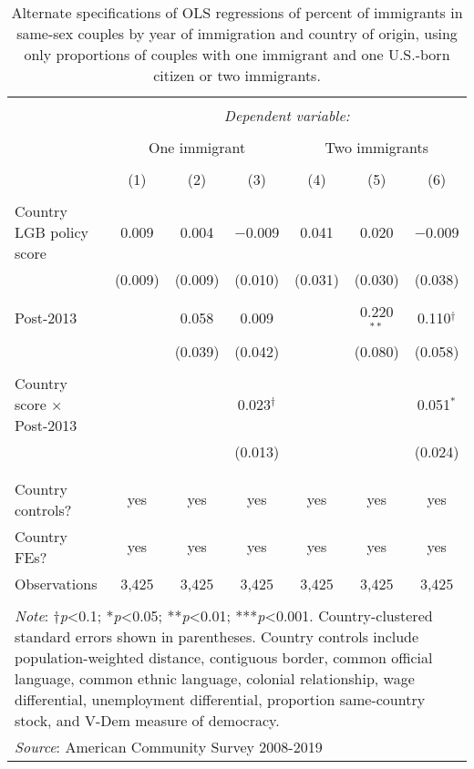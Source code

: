 \documentclass[
  11pt,
]{article}
\begin{document}
\begin{table}[H] \centering 
  \caption{Alternate specifications of OLS regressions of percent of immigrants in same-sex couples by year of immigration and country of origin, using only proportions of couples with one immigrant and one U.S.-born citizen or two immigrants.} 
  \label{tab:country-props-alt2} 
\begin{tabular}{@{\extracolsep{5pt}}lcccccc} 
\\[-1.8ex]\hline 
\hline \\[-1.8ex] 
 & \multicolumn{6}{c}{\textit{Dependent variable:}} \\ 
\cline{2-7} 
\\[-1.8ex] & \multicolumn{3}{c}{One immigrant} & \multicolumn{3}{c}{Two immigrants} \\ 
\\[-1.8ex] & (1) & (2) & (3) & (4) & (5) & (6)\\ 
\hline \\[-1.8ex] 
 Country LGB policy score & 0.009 & 0.004 & $-$0.009 & 0.041 & 0.020 & $-$0.009 \\ 
  & (0.009) & (0.009) & (0.010) & (0.031) & (0.030) & (0.038) \\ 
  & & & & & & \\ 
 Post-2013 &  & 0.058 & 0.009 &  & 0.220$^{**}$ & 0.110$^{†}$ \\ 
  &  & (0.039) & (0.042) &  & (0.080) & (0.058) \\ 
  & & & & & & \\ 
 Country score × Post-2013 &  &  & 0.023$^{†}$ &  &  & 0.051$^{*}$ \\ 
  &  &  & (0.013) &  &  & (0.024) \\ 
  & & & & & & \\ 
\hline \\[-1.8ex] 
Country controls? & yes & yes & yes & yes & yes & yes \\ 
Country FEs? & yes & yes & yes & yes & yes & yes \\ 
Observations & 3,425 & 3,425 & 3,425 & 3,425 & 3,425 & 3,425 \\ 
\hline 
\hline \\[-1.8ex] 
\multicolumn{7}{l}{\parbox[t]{\textwidth}{\textit{Note}: †\textit{p}<0.1; *\textit{p}<0.05; **\textit{p}<0.01; ***\textit{p}<0.001. Country-clustered standard errors shown in parentheses. Country controls include population-weighted distance, contiguous border, common official language, common ethnic language, colonial relationship, wage differential, unemployment differential, proportion same-country stock, and V-Dem measure of democracy.}} \\ 
\multicolumn{7}{l}{\textit{Source}: American Community Survey 2008-2019} \\ 
\end{tabular} 
\end{table}
\end{document}
